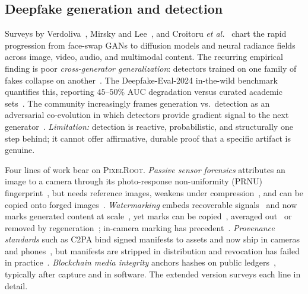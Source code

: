 \documentclass[journal]{IEEEtran}
\newcommand{\pr}{\textup{\textsc{PixelRoot}}}
\begin{document}
\subsection{Deepfake generation and detection}
Surveys by Verdoliva~\cite{verdoliva2020media}, Mirsky and
Lee~\cite{mirsky2021creation}, and Croitoru \emph{et
al.}~\cite{croitoru2024deepfake} chart the rapid progression from face-swap GANs
to diffusion models and neural radiance fields across image, video, audio, and
multimodal content. The recurring empirical finding is poor
\emph{cross-generator generalization}: detectors trained on one family of fakes
collapse on another~\cite{croitoru2024deepfake,deepfakevideo2024review}. The
\mbox{Deepfake-Eval-2024} in-the-wild benchmark quantifies this, reporting
$45$--$50\%$ AUC degradation versus curated academic
sets~\cite{chandra2025deepfakeeval}. The community increasingly frames
generation vs.\ detection as an adversarial co-evolution in which detectors
provide gradient signal to the next generator~\cite{tugofwar2024}. \emph{Limitation:}
detection is reactive, probabilistic, and structurally one step behind; it
cannot offer affirmative, durable proof that a specific artifact is genuine.

\fi
\ifshort
Four lines of work bear on \pr{}. \emph{Passive sensor forensics} attributes an
image to a camera through its photo-response non-uniformity (PRNU)
fingerprint~\cite{lukas2006digital,chen2008determining}, but needs reference images,
weakens under compression~\cite{prnubench2025}, and can be copied onto forged
images~\cite{goljan2011defending}. \emph{Watermarking} embeds recoverable
signals~\cite{begum2020digital,cox1997secure,hartung1998watermarking} and now marks
generated content at scale~\cite{gowal2025synthid,fernandez2024videoseal,bui2023trustmark},
yet marks can be copied~\cite{kutter2000copy}, averaged
out~\cite{yang2024steganalysis} or removed by regeneration~\cite{zhao2024invisible,saberi2024robustness};
in-camera marking has precedent~\cite{blythe2004secure}. \emph{Provenance standards}
such as C2PA bind signed manifests to assets and now ship in
cameras and phones~\cite{c2pa2024spec,google2025c2pa,truepic2024capture,proofmode2023},
but manifests are stripped in distribution and revocation has failed in
practice~\cite{c2pa2026security}. \emph{Blockchain media integrity} anchors hashes
on public ledgers~\cite{hasan2019combating,qureshi2021blockchain,videowmblockchain2024},
typically after capture and in software. The extended version surveys each line
in detail.

\else
\end{document}
